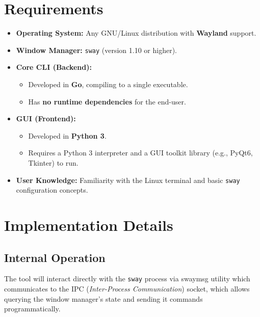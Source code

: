 \documentclass[12pt, letterpaper]{article}
\begin{document}
\section*{Requirements}
\begin{itemize}
    \item \textbf{Operating System:} Any GNU/Linux distribution with \textbf{Wayland} support.
    \item \textbf{Window Manager:} \texttt{sway} (version 1.10 or higher).
    \item \textbf{Core CLI (Backend):}
    \begin{itemize}
        \item Developed in \textbf{Go}, compiling to a single executable.
        \item Has \textbf{no runtime dependencies} for the end-user.
    \end{itemize}
    \item \textbf{GUI (Frontend):}
    \begin{itemize}
        \item Developed in \textbf{Python 3}.
        \item Requires a Python 3 interpreter and a GUI toolkit library (e.g., PyQt6, Tkinter) to run.
    \end{itemize}
    \item \textbf{User Knowledge:} Familiarity with the Linux terminal and basic \texttt{sway} configuration concepts.
\end{itemize}

\section*{Implementation Details}

\subsection*{Internal Operation}

The tool will interact directly with the \texttt{sway} process via swaymsg utility which communicates to the IPC (\textit{Inter-Process Communication}) socket, which allows querying the window manager's state and sending it commands programmatically.
\end{document}
